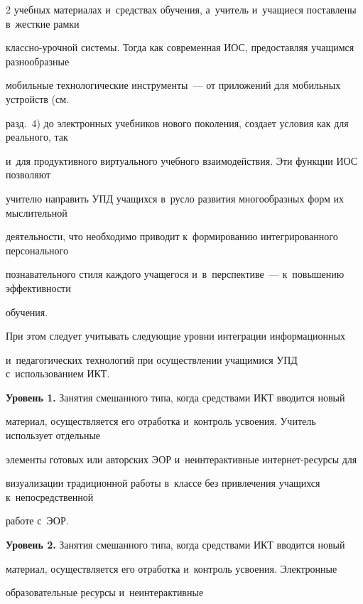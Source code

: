 \begin{multicols}{2}
учебных материалах и~средствах обучения, а~учитель и~учащиеся поставлены в~жесткие рамки


клас\-сно-уроч\-ной сис\-те\-мы. Тогда как современная ИОС, предоставляя учащимся разнообразные


мобильные технологические инструменты~--- от приложений для мобильных устройств (см.\


разд.~4) до электронных учебников нового поколения, создает условия как для реального, так


и~для продуктивного виртуального учебного взаимодействия. Эти функции ИОС позволяют


учителю направить УПД учащихся в~русло развития многообразных форм их мыслительной


дея\-тель\-ности, что необходимо приводит к~формированию интегрированного персонального


познавательного стиля каждого учащегося и~в~перспективе~--- к~повышению эффективности


обучения.


  При этом следует учитывать следующие уровни интеграции информационных


и~педагогических технологий при осуществлении учащимися УПД с~использованием ИКТ.





  \bigskip





  \textbf{Уровень 1.} Занятия смешанного типа, когда средствами ИКТ вводится новый


материал, осуществляется его отработка и~контроль усвоения. Учитель использует отдельные


элементы готовых или авторских ЭОР и~неинтерактивные ин\-тер\-нет-ре\-сур\-сы для


визуализации традиционной работы в~классе без привлечения учащихся к~непосредственной


работе с~ЭОР.





\smallskip





  \textbf{Уровень 2.} Занятия смешанного типа, когда средствами ИКТ вводится новый


материал, осуще\-ствляется его отработка и~контроль усвоения. Электронные


образовательные ресурсы и~неинтерактивные



\end{multicols}
